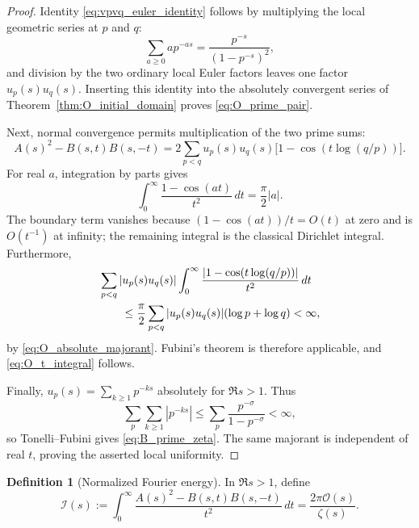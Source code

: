 \documentclass[11pt]{amsart}
\numberwithin{equation}{section}
\theoremstyle{plain}
\theoremstyle{definition}
\newtheorem{definition}[theorem]{Definition}
\theoremstyle{remark}
\begin{document}
\begin{proof}
Identity \eqref{eq:vpvq_euler_identity} follows by multiplying the local
geometric series at \(p\) and \(q\):
\begin{equation}
\sum_{a\ge0}a p^{-as}=\frac{p^{-s}}{(1-p^{-s})^2},
\label{eq:vp_local_sum}
\end{equation}
and division by the two ordinary local Euler factors leaves one factor
\(u_p(s)u_q(s)\).  Inserting this identity into the absolutely convergent
series of Theorem~\ref{thm:O_initial_domain} proves
\eqref{eq:O_prime_pair}.

Next, normal convergence permits multiplication of the two prime sums:
\begin{equation}
A(s)^2-B(s,t)B(s,-t)
=
2\sum_{p<q}u_p(s)u_q(s)
\bigl[1-\cos(t\log(q/p))\bigr].
\label{eq:A2_minus_BB_pair_expansion}
\end{equation}
For real \(a\), integration by parts gives
\begin{equation}
\int_0^\infty\frac{1-\cos(at)}{t^2}\,dt
=
\frac{\pi}{2}|a|.
\label{eq:cosine_energy_identity}
\end{equation}
The boundary term vanishes because
\((1-\cos(at))/t=O(t)\) at zero and is \(O(t^{-1})\) at infinity; the
remaining integral is the classical Dirichlet integral.
Furthermore,
\begin{align}
&\sum_{p<q}|u_p(s)u_q(s)|
\int_0^\infty
\frac{|1-\cos(t\log(q/p))|}{t^2}\,dt
\notag\\
&\qquad\le
\frac{\pi}{2}
\sum_{p<q}|u_p(s)u_q(s)|(\log p+\log q)<\infty,
\label{eq:fubini_energy_majorant}
\end{align}
by \eqref{eq:O_absolute_majorant}.  Fubini's theorem is therefore applicable,
and \eqref{eq:O_t_integral} follows.

Finally, \(u_p(s)=\sum_{k\ge1}p^{-ks}\) absolutely for \(\Re s>1\).  Thus
\begin{equation}
\sum_p\sum_{k\ge1}|p^{-ks}|
\le
\sum_p\frac{p^{-\sigma}}{1-p^{-\sigma}}<\infty,
\label{eq:B_double_absolute}
\end{equation}
so Tonelli--Fubini gives \eqref{eq:B_prime_zeta}.  The same majorant is
independent of real \(t\), proving the asserted local uniformity.
\end{proof}

\begin{definition}[Normalized Fourier energy]
\label{def:I_s}
In \(\Re s>1\), define
\begin{equation}
\boxed{
\mathcal I(s)
:=
\int_0^\infty
\frac{A(s)^2-B(s,t)B(s,-t)}{t^2}\,dt
=
\frac{2\pi\mathcal O(s)}{\zeta(s)}.}
\label{eq:I_definition}
\end{equation}
\end{definition}
\end{document}
